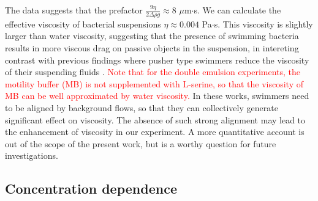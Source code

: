 \documentclass[%
10pt,
superscriptaddress,
twocolumn,
 amsmath,amssymb,
 aps,prx,
]{revtex4-2}
\begin{document}
The data suggests that the prefactor $\frac{9\eta}{2\Delta\rho g}\approx 8$ $\mu$m$\cdot$s.
We can calculate the effective viscosity of bacterial suspensions $\eta\approx 0.004$ Pa$\cdot$s.
This viscosity is slightly larger than water viscosity, suggesting that the presence of swimming bacteria results in more viscous drag on passive objects in the suspension, in intereting contrast with previous findings where pusher type swimmers reduce the viscosity of their suspending fluids \cite{Hatwalne2004, Gachelin2013, Giomi2010, Haines2008, Haines2009, Martinez2020, Slomka2017, Sokolov2009, Lopez2015, Guo2018, Liu2019}. 
\textcolor{red}{Note that for the double emulsion experiments, the motility buffer (MB) is not supplemented with L-serine, so that the viscosity of MB can be well approximated by water viscosity.}
In these works, swimmers need to be aligned by background flows, so that they can collectively generate significant effect on viscosity. 
The absence of such strong alignment may lead to the enhancement of viscosity in our experiment.
A more quantitative account is out of the scope of the present work, but is a worthy question for future investigations.

\subsection{Concentration dependence}
\end{document}
